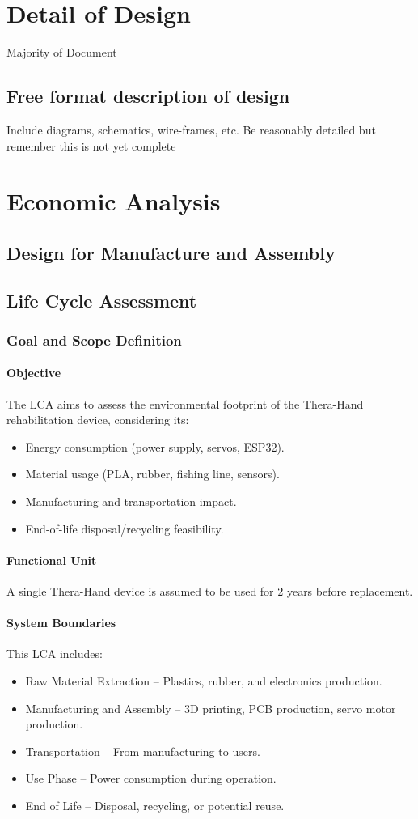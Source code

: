 \documentclass{article}
\begin{document}
\section{Detail of Design}
Majority of Document

\subsection{Free format description of design}
Include diagrams, schematics, wire-frames, etc.
Be reasonably detailed but remember this is not yet complete

\section{Economic Analysis}

\subsection{Design for Manufacture and Assembly}

\subsection{Life Cycle Assessment}
\subsubsection{Goal and Scope Definition}
\paragraph{Objective}
The LCA aims to assess the environmental footprint of the Thera-Hand rehabilitation device, considering its:
\begin{itemize}
\item Energy consumption (power supply, servos, ESP32).
\item Material usage (PLA, rubber, fishing line, sensors).
\item Manufacturing and transportation impact.
\item End-of-life disposal/recycling feasibility.
\end{itemize}
\paragraph{Functional Unit}
A single Thera-Hand device is assumed to be used for 2 years before replacement.
\paragraph{System Boundaries}
This LCA includes:
\begin{itemize}
\item Raw Material Extraction – Plastics, rubber, and electronics production.
\item Manufacturing and Assembly – 3D printing, PCB production, servo motor production.
\item Transportation – From manufacturing to users.
\item Use Phase – Power consumption during operation.
\item End of Life – Disposal, recycling, or potential reuse.
\end{itemize}
\end{document}
